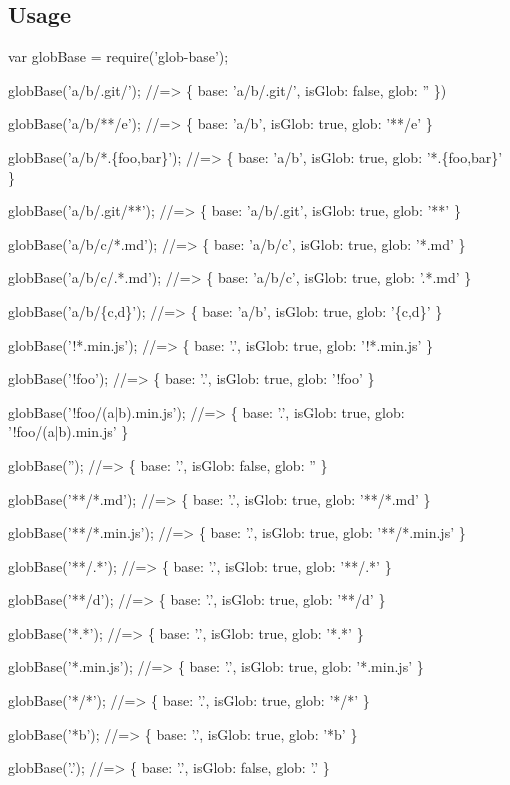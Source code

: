 \subsection*{Usage}


\begin{DoxyCode}
var globBase = require('glob-base');

globBase('a/b/.git/');
//=> \{ base: 'a/b/.git/', isGlob: false, glob: '' \})

globBase('a/b/**/e');
//=> \{ base: 'a/b', isGlob: true, glob: '**/e' \}

globBase('a/b/*.\{foo,bar\}');
//=> \{ base: 'a/b', isGlob: true, glob: '*.\{foo,bar\}' \}

globBase('a/b/.git/**');
//=> \{ base: 'a/b/.git', isGlob: true, glob: '**' \}

globBase('a/b/c/*.md');
//=> \{ base: 'a/b/c', isGlob: true, glob: '*.md' \}

globBase('a/b/c/.*.md');
//=> \{ base: 'a/b/c', isGlob: true, glob: '.*.md' \}

globBase('a/b/\{c,d\}');
//=> \{ base: 'a/b', isGlob: true, glob: '\{c,d\}' \}

globBase('!*.min.js');
//=> \{ base: '.', isGlob: true, glob: '!*.min.js' \}

globBase('!foo');
//=> \{ base: '.', isGlob: true, glob: '!foo' \}

globBase('!foo/(a|b).min.js');
//=> \{ base: '.', isGlob: true, glob: '!foo/(a|b).min.js' \}

globBase('');
//=> \{ base: '.', isGlob: false, glob: '' \}

globBase('**/*.md');
//=> \{ base: '.', isGlob: true, glob: '**/*.md' \}

globBase('**/*.min.js');
//=> \{ base: '.', isGlob: true, glob: '**/*.min.js' \}

globBase('**/.*');
//=> \{ base: '.', isGlob: true, glob: '**/.*' \}

globBase('**/d');
//=> \{ base: '.', isGlob: true, glob: '**/d' \}

globBase('*.*');
//=> \{ base: '.', isGlob: true, glob: '*.*' \}

globBase('*.min.js');
//=> \{ base: '.', isGlob: true, glob: '*.min.js' \}

globBase('*/*');
//=> \{ base: '.', isGlob: true, glob: '*/*' \}

globBase('*b');
//=> \{ base: '.', isGlob: true, glob: '*b' \}

globBase('.');
//=> \{ base: '.', isGlob: false, glob: '.' \}


\end{DoxyCode}
